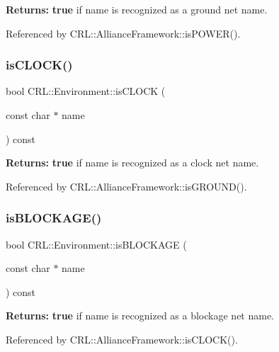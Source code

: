{\bfseries Returns\+:} {\bfseries true} if {\ttfamily name} is recognized as a ground net name. 

Referenced by C\+R\+L\+::\+Alliance\+Framework\+::is\+P\+O\+W\+E\+R().

\mbox{\label{classCRL_1_1Environment_a9ae0d48d88797a7a5421edf5978bf3d7}} 
\subsubsection{\texorpdfstring{is\+C\+L\+O\+C\+K()}{isCLOCK()}}
{\footnotesize\ttfamily bool C\+R\+L\+::\+Environment\+::is\+C\+L\+O\+CK (\begin{DoxyParamCaption}\item[{const char $\ast$}]{name }\end{DoxyParamCaption}) const}

{\bfseries Returns\+:} {\bfseries true} if {\ttfamily name} is recognized as a clock net name. 

Referenced by C\+R\+L\+::\+Alliance\+Framework\+::is\+G\+R\+O\+U\+N\+D().

\mbox{\label{classCRL_1_1Environment_a6f1ce36d1636f2ec701b0904f461e6b7}} 
\subsubsection{\texorpdfstring{is\+B\+L\+O\+C\+K\+A\+G\+E()}{isBLOCKAGE()}}
{\footnotesize\ttfamily bool C\+R\+L\+::\+Environment\+::is\+B\+L\+O\+C\+K\+A\+GE (\begin{DoxyParamCaption}\item[{const char $\ast$}]{name }\end{DoxyParamCaption}) const}

{\bfseries Returns\+:} {\bfseries true} if {\ttfamily name} is recognized as a blockage net name. 

Referenced by C\+R\+L\+::\+Alliance\+Framework\+::is\+C\+L\+O\+C\+K().

\mbox{\label{classCRL_1_1Environment_a8a82d0a983c502e1dc97944ab496d8e5}} 
